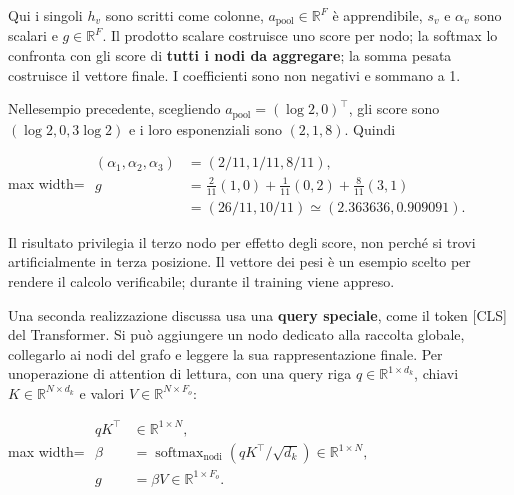 \documentclass[11pt,a4paper,oneside,openany]{book}
\begin{document}
Qui i singoli \(h_v\) sono scritti come colonne, \(a_{\mathrm{pool}}\in\mathbb R^F\) è apprendibile, \(s_v\) e \(\alpha_v\) sono scalari e \(g\in\mathbb R^F\). Il prodotto scalare costruisce uno score per nodo; la softmax lo confronta con gli score di \textbf{tutti i nodi da aggregare}; la somma pesata costruisce il vettore finale. I coefficienti sono non negativi e sommano a 1.

Nell\textquotesingle esempio precedente, scegliendo \(a_{\mathrm{pool}}=(\log2,0)^\top\), gli score sono \((\log2,0,3\log2)\) e i loro esponenziali sono \((2,1,8)\). Quindi

\begin{center}
\begin{adjustbox}{max width=\linewidth}
$\displaystyle \begin{aligned}
(\alpha_1,\alpha_2,\alpha_3)&=(2/11,1/11,8/11),\\
g&=\frac2{11}(1,0)+\frac1{11}(0,2)+\frac8{11}(3,1)\\
&=(26/11,10/11)\simeq(2.363636,0.909091).
\end{aligned}$
\end{adjustbox}
\end{center}

Il risultato privilegia il terzo nodo per effetto degli score, non perché si trovi artificialmente in terza posizione. Il vettore dei pesi è un esempio scelto per rendere il calcolo verificabile; durante il training viene appreso.

Una seconda realizzazione discussa usa una \textbf{query speciale}, come il token {[}CLS{]} del Transformer. Si può aggiungere un nodo dedicato alla raccolta globale, collegarlo ai nodi del grafo e leggere la sua rappresentazione finale. Per un\textquotesingle operazione di attention di lettura, con una query riga \(q\in\mathbb R^{1\times d_k}\), chiavi \(K\in\mathbb R^{N\times d_k}\) e valori \(V\in\mathbb R^{N\times F_o}\):

\begin{center}
\begin{adjustbox}{max width=\linewidth}
$\displaystyle \begin{aligned}
qK^\top&\in\mathbb R^{1\times N},\\
\beta&=\operatorname{softmax}_{\mathrm{nodi}}(qK^\top/\sqrt{d_k})\in\mathbb R^{1\times N},\\
g&=\beta V\in\mathbb R^{1\times F_o}.
\end{aligned}$
\end{adjustbox}
\end{center}
\end{document}
